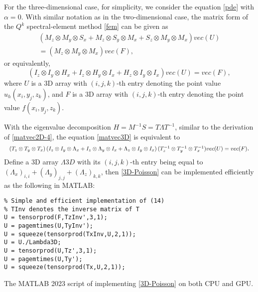 \documentclass{article}
\begin{document}
For the three-dimensional case, for simplicity, we consider the equation \eqref{pde}  with $\alpha=0$. With similar notation as in the two-dimensional case, the matrix form of the $Q^k$ spectral-element method \eqref{fem} can be given as
\begin{eqnarray*}
    \left(M_{z}\otimes M_{y}\otimes S_{x} + M_{z}\otimes S_{y}\otimes M_{x} + S_{z}\otimes M_{y}\otimes M_{x} \right)vec(U) \\
    =\left(M_{z}\otimes M_{y}\otimes M_{x} \right)vec(F),
\end{eqnarray*}
or equivalently,
\begin{equation}\label{matvec3D}
    \left(I_{z}\otimes I_{y}\otimes H_{x} + I_{z}\otimes H_{y}\otimes I_{x} + H_{z}\otimes I_{y}\otimes I_{x} \right)vec(U) =vec(F),
\end{equation}
where $U$ is a 3D array with $(i,j,k)$-th entry denoting the point value $u_h(x_i,y_j,z_k)$, and $F$ is a 3D array with $(i,j,k)$-th entry denoting the point value $f(x_i,y_j,z_k)$.



With the eigenvalue decomposition $H=M^{-1}S=T\Lambda T^{-1}$,
similar to the derivation of \eqref{matvec2D-4},
 the equation
\eqref{matvec3D} is equivalent to 
\begin{equation}
    \label{3D-Poisson}
\resizebox{.99\hsize}{!}{$ (T_z \otimes T_y \otimes T_x) \left( I_{z}\otimes I_{y}\otimes \Lambda_{x} + I_{z}\otimes \Lambda_{y}\otimes I_{x} + \Lambda_{z}\otimes I_{y}\otimes I_{x} \right)(T_z^{-1}\otimes T_y^{-1}\otimes T_x^{-1}) vec(U) =vec(F)$}.
\end{equation}
Define a 3D array $\Lambda3D$ with its $(i,j,k)$-th entry being equal to $(\Lambda_x)_{i,i}+(\Lambda_y)_{j,j}+(\Lambda_z)_{k,k}$, then 
\eqref{3D-Poisson}
can be implemented efficiently as the following in MATLAB:
\begin{table}[htbp]
    \centering
  \begin{lstlisting}
% Simple and efficient implementation of (14)
% TInv denotes the inverse matrix of T
U = tensorprod(F,TzInv',3,1);
U = pagemtimes(U,TyInv');
U = squeeze(tensorprod(TxInv,U,2,1));
U = U./Lambda3D;
U = tensorprod(U,Tz',3,1);
U = pagemtimes(U,Ty');
U = squeeze(tensorprod(Tx,U,2,1));
\end{lstlisting}
    \caption{The MATLAB 2023 script of implementing \eqref{3D-Poisson} on both CPU and GPU.}
    \label{tab:3dcode}
\end{table}
\end{document}

